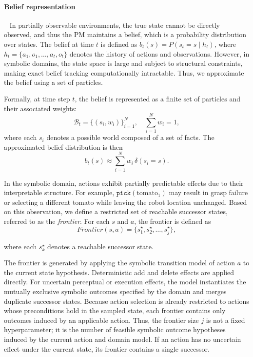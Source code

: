 \paragraph{Belief representation}~\label{method:belief_rep}
In partially observable environments, the true state cannot be directly observed, and thus the PM maintains a belief, which is a probability distribution over states. The belief at time $t$ is defined as $b_t(s) = P(s_t = s \mid h_t)$, where $h_t = \{a_1, o_1, \dots, a_t, o_t \}$ denotes the history of actions and observations. However, in symbolic domains, the state space is large and subject to structural constraints, making exact belief tracking computationally intractable. Thus, we approximate the belief using a set of particles.

Formally, at time step $t$, the belief is represented as a finite set of particles and their associated weights:
\[
\mathcal{B}_t = \{ (s_i, w_i) \}_{i=1}^{N}, \quad \sum_{i=1}^{N} w_i = 1,
\]
where each $s_i$ denotes a possible world composed of a set of facts. The approximated belief distribution is then
\[
b_t(s) \approx \sum_{i=1}^{N} w_i \, \delta(s_i = s).
\]

In the symbolic domain, actions exhibit partially predictable effects due to their interpretable structure. For example, $\texttt{pick}(\text{tomato}_1)$ may result in grasp failure or selecting a different tomato while leaving the robot location unchanged. Based on this observation, we define a restricted set of reachable successor states, referred to as the \textit{frontier}. For each $s$ and $a$, the frontier is defined as
\[
Frontier(s,a) = \{ s_1^{\star}, s_2^{\star}, \dots, s_j^{\star} \},
\]

where each $s_k^{\star}$ denotes a reachable successor state.

The frontier is generated by applying the symbolic transition model of action $a$ to the current state hypothesis. Deterministic add and delete effects are applied directly. For uncertain perceptual or execution effects, the model instantiates the mutually exclusive symbolic outcomes specified by the domain and merges duplicate successor states. Because action selection is already restricted to actions whose preconditions hold in the sampled state, each frontier contains only outcomes induced by an applicable action. Thus, the frontier size $j$ is not a fixed hyperparameter; it is the number of feasible symbolic outcome hypotheses induced by the current action and domain model. If an action has no uncertain effect under the current state, its frontier contains a single successor.

